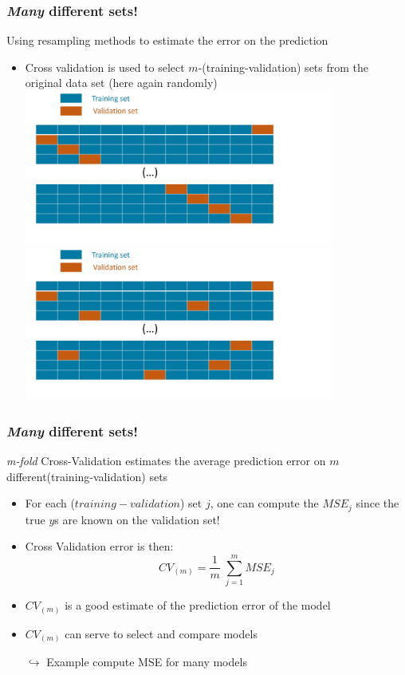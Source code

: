 \documentclass[xcolor=x11names,compress, aspectratio=169]{beamer}
\renewcommand{\(}{\begin{columns}}
\renewcommand{\)}{\end{columns}}
\newcommand{\<}[1]{\begin{column}{#1}}
\renewcommand{\>}{\end{column}}
\begin{document}
\begin{frame}
\frametitle{\textcolor{brique}{\textit{Many} different sets!  }}
Using resampling methods to  estimate the error on the prediction
\pause
\begin{itemize}[<+->]\item Cross validation is used to select $m$-(training-validation) sets from the original data set (here again randomly)
 {\includegraphics[width = 0.8\textwidth]{CV-Sets1.png}}
 {\includegraphics[width = 0.8\textwidth]{CV-Sets2.png}}
 \item[]
\end{itemize}
\end{frame}

\begin{frame}
\frametitle{\textcolor{brique}{\textit{Many} different sets!  }}
\textit{m-fold} Cross-Validation estimates the average prediction error on $m$ different(training-validation) sets
\pause
\begin{itemize}[<+->]
\item For each ($training-validation$) set $j$, one can compute the $MSE_j$ since the true $y$s are known on the validation set!
\item Cross Validation error is then:
 $$ CV_{(m)}  =  \frac{1}{m} \; \sum_ {j=1}^m   MSE_j$$
 \item $CV_{(m)}$ is a good estimate of the prediction error of the model
 \item  $CV_{(m)} $  can serve to select and compare models
 \item[$\hookrightarrow$] Example compute MSE for many models
\end{itemize}
\end{frame}
\end{document}
